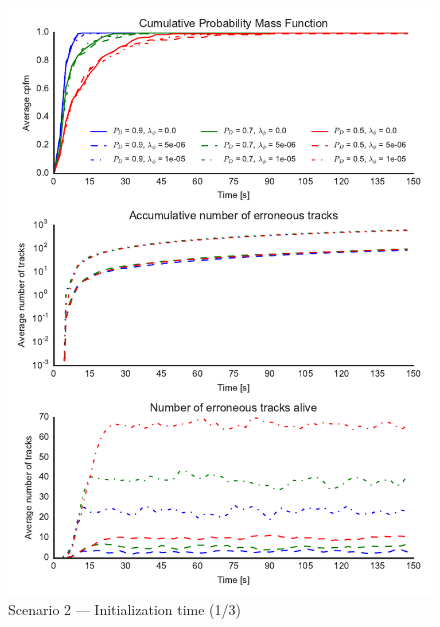 \begin{figure}
\centering
\includegraphics{Figures/plots/Scenario2_Init-Time(1-3).pdf}
\caption{Scenario 2 --- Initialization time (1/3)}\label{fig:init2_time_1-3}
\end{figure}

